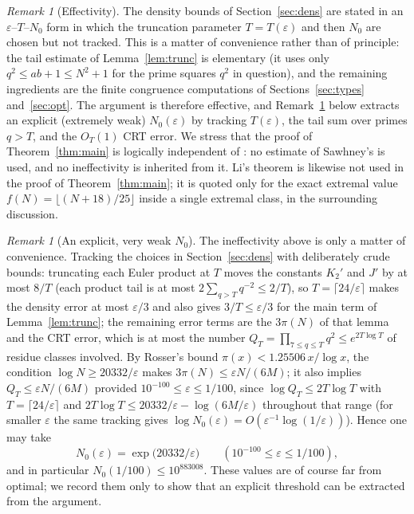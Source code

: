 \documentclass[11pt,a4paper]{article}
\theoremstyle{plain}
\theoremstyle{definition}
\theoremstyle{remark}
\newtheorem{remark}[theorem]{Remark}
\begin{document}
\begin{remark}[Effectivity]\label{rem:ineff}
The density bounds of
Section~\ref{sec:dens} are stated in an $\varepsilon$--$T$--$N_0$ form in which the truncation
parameter $T=T(\varepsilon)$ and then $N_0$ are chosen but not tracked. This is a matter of
convenience rather than of principle: the tail estimate of Lemma~\ref{lem:trunc} is elementary
(it uses only $q^{2}\le ab+1\le N^{2}+1$ for the prime squares $q^{2}$ in question), and the
remaining ingredients are the finite congruence computations of
Sections~\ref{sec:types} and~\ref{sec:opt}. The argument is therefore effective, and
Remark~\ref{rem:explicitN0} below extracts an explicit (extremely weak) $N_0(\varepsilon)$ by
tracking $T(\varepsilon)$, the tail sum over primes $q>T$, and the $O_T(1)$ CRT
error. We stress that the proof of Theorem~\ref{thm:main} is logically
independent of \cite{Sawhney}: no estimate of Sawhney's is used, and no ineffectivity is inherited
from it. Li's theorem \cite{Li} is likewise not used in the proof of Theorem~\ref{thm:main}; it is
quoted only for the exact extremal value $f(N)=\lfloor (N+18)/25\rfloor$ inside a single extremal
class, in the surrounding discussion.
\end{remark}

\begin{remark}[An explicit, very weak $N_0$]\label{rem:explicitN0}
The ineffectivity above is only a matter of convenience. Tracking the choices in
Section~\ref{sec:dens} with deliberately crude bounds: truncating each Euler product at $T$
moves the constants $K_2'$ and $J'$ by at most $8/T$ (each product tail is at most
$2\sum_{q>T}q^{-2}\le 2/T$), so $T=\lceil 24/\varepsilon\rceil$ makes the density error at most
$\varepsilon/3$ and also gives $3/T\le\varepsilon/3$ for the main term of
Lemma~\ref{lem:trunc}; the remaining error terms are the $3\pi(N)$ of that lemma and the CRT
error, which is at most the number $Q_T=\prod_{7\le q\le T}q^{2}\le e^{2T\log T}$ of residue classes
involved. By Rosser's bound $\pi(x)<1.25506\,x/\log x$, the condition
$\log N\ge 20332/\varepsilon$ makes $3\pi(N)\le\varepsilon N/(6M)$; it also implies
$Q_T\le\varepsilon N/(6M)$ provided $10^{-100}\le\varepsilon\le 1/100$, since
$\log Q_T\le 2T\log T$ with $T=\lceil 24/\varepsilon\rceil$ and
$2T\log T\le 20332/\varepsilon-\log(6M/\varepsilon)$ throughout that range (for smaller
$\varepsilon$ the same tracking gives $\log N_0(\varepsilon)=O(\varepsilon^{-1}\log(1/\varepsilon))$).
Hence one may take
\[
 N_0(\varepsilon)=\exp\bigl(20332/\varepsilon\bigr)\qquad(10^{-100}\le\varepsilon\le 1/100),
\]
and in particular $N_0(1/100)\le 10^{883008}$. These values are of course far from optimal; we
record them only to show that an explicit threshold can be extracted from the argument.
\end{remark}
\end{document}
